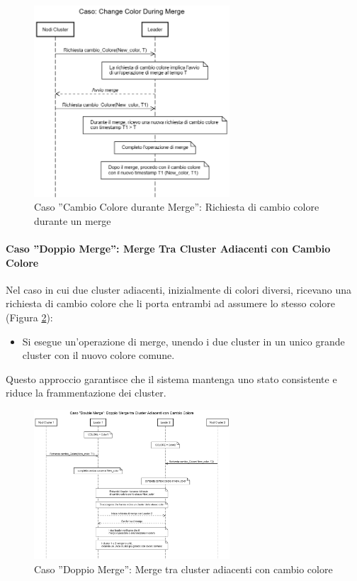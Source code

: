 \documentclass[12pt, a4paper]{report}
\begin{document}
\begin{figure}[H]
    \centering
    \includegraphics[width=0.65\textwidth,align=t]{images/concorrenza/change_color_during_merge.png}
    \caption{Caso ''Cambio Colore durante Merge'': Richiesta di cambio colore durante un merge}
    \label{fig:change_color_during_merge}
\end{figure}

\newpage
\paragraph{Caso ''Doppio Merge'': Merge Tra Cluster Adiacenti con Cambio Colore}\label{par:double_merge}

Nel caso in cui due cluster adiacenti, inizialmente di colori diversi, ricevano una richiesta di cambio colore che li porta entrambi ad assumere lo stesso colore (Figura \ref{fig:double_merge}):

\begin{itemize}
    \item Si esegue un'operazione di merge, unendo i due cluster in un unico grande cluster con il nuovo colore comune.
\end{itemize}

Questo approccio garantisce che il sistema mantenga uno stato consistente e riduce la frammentazione dei cluster.

\begin{figure}[H]
    \centering
    \includegraphics[width=0.65\textwidth,align=t]{images/concorrenza/doubleMerge.png}
    \caption{Caso ''Doppio Merge'': Merge tra cluster adiacenti con cambio colore}
    \label{fig:double_merge}
\end{figure}
\end{document}
